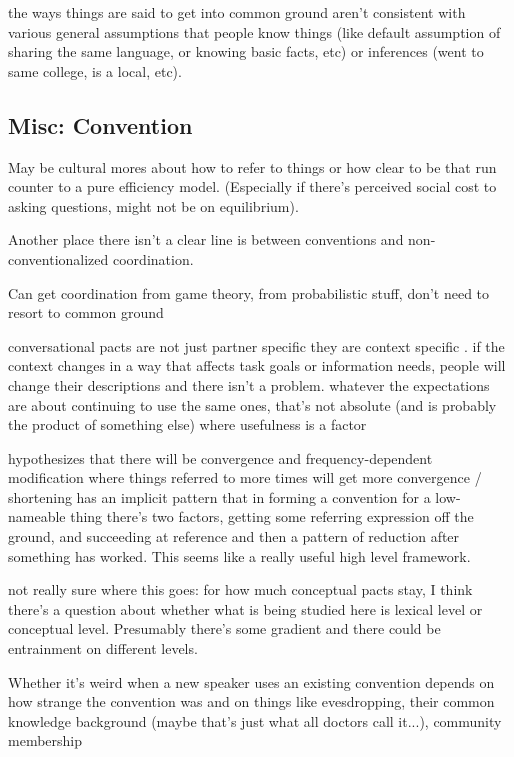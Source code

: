 \documentclass[]{article}
\begin{document}
the ways things are said to get into common ground aren't consistent with various general assumptions that people know things (like default assumption of sharing the same language, or knowing basic facts, etc) or inferences (went to same college, is a local, etc). 



\subsection{Misc: Convention}

May be cultural mores about how to refer to things or how clear to be that run counter to a pure efficiency model. (Especially if there's perceived social cost to asking questions, might not be on equilibrium). 


Another place there isn't a clear line is between conventions and non-conventionalized coordination. 

Can get coordination from game theory, from probabilistic stuff, don't need to resort to common ground

conversational pacts are not just partner specific they are context specific \cite{ibarra2016}. if the context changes in a way that affects task goals or information needs, people will change their descriptions and there isn't a problem. whatever the expectations are about continuing to use the same ones, that's not absolute (and is probably the product of something else) where usefulness is a factor 

\cite{krauss1964} hypothesizes that there will be convergence and frequency-dependent modification where things referred to more times will get more convergence / shortening
 \cite{leung2023} has an implicit pattern that in forming a convention for a low-nameable thing there's two factors, getting some referring expression off the ground, and succeeding at reference and then a pattern of reduction after something has worked. This seems like a really useful high level framework. 
 
 not really sure where this goes: \cite{metzing2003a} for how much conceptual pacts stay, I think there's a question about whether what is being studied here is lexical level or conceptual level. Presumably there's some gradient and there could be entrainment on different levels. 
 
 Whether it's weird when a new speaker uses an existing convention depends on how strange the convention was and on things like evesdropping, their common knowledge background (maybe that's just what all doctors call it...), community membership
 
\end{document}
